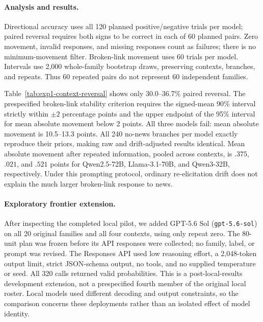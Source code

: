 \paragraph{Analysis and results.}
Directional accuracy uses all 120 planned positive/negative trials per model;
paired reversal requires both signs to be correct in each of 60 planned pairs.
Zero movement, invalid responses, and missing responses count as failures; there
is no minimum-movement filter. Broken-link movement uses 60 trials per model.
Intervals use 2,000 whole-family bootstrap draws, preserving contexts, branches,
and repeats. Thus 60 repeated pairs do not represent 60 independent families.

\begin{center}
\begin{minipage}{\linewidth}
\centering
{}
\label{tab:exp1-context-reversal}
\small

\end{minipage}
\end{center}

Table~\ref{tab:exp1-context-reversal} shows only 30.0--36.7\% paired reversal.
The prespecified broken-link stability criterion requires the signed-mean 90\%
interval strictly within $\pm2$ percentage points and the upper endpoint of the
95\% interval for mean absolute movement below 2 points. All three models fail:
mean absolute movement is 10.5--13.3 points. All 240 no-news branches per model
exactly reproduce their priors, making raw and drift-adjusted results identical.
Mean absolute movement after repeated information, pooled across contexts, is
$.375$, $.021$, and $.521$ points for Qwen2.5-72B, Llama-3.1-70B, and Qwen3-32B,
respectively. Under this prompting protocol, ordinary re-elicitation drift does
not explain the much larger broken-link response to news.

\paragraph{Exploratory frontier extension.}
After inspecting the completed local pilot, we added GPT-5.6 Sol
(\texttt{gpt-5.6-sol}) on all 20 original families and all four contexts, using
only repeat zero. The 80-unit plan was frozen before its API responses were
collected; no family, label, or prompt was revised. The Responses API used low
reasoning effort, a 2,048-token output limit, strict JSON-schema output, no tools,
and no supplied temperature or seed. All 320 calls returned valid probabilities.
This is a post-local-results development extension, not a prespecified fourth
member of the original local roster. Local models used different decoding and
output constraints, so the comparison concerns these deployments rather than an
isolated effect of model identity.

